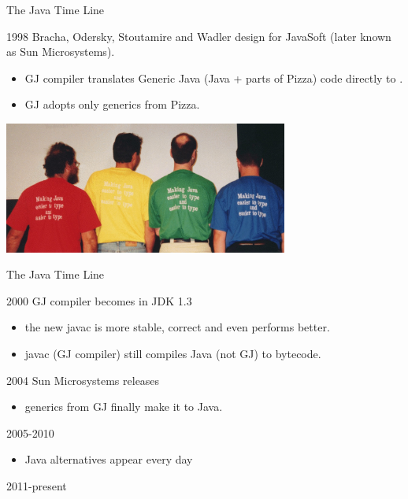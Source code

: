 \begin{frame}{The Java Time Line}
\begin{block}{1998}
Bracha, Odersky, Stoutamire and Wadler design  for
JavaSoft (later known as Sun Microsystems).
\begin{itemize}
\item GJ compiler translates Generic Java (Java + parts of Pizza)
 code directly to .
\item GJ adopts only generics from Pizza.
\end{itemize}
\end{block}
\begin{center}
\includegraphics[width=0.7\textwidth]{resources/GJBack.jpg}
\end{center}
\end{frame}

\begin{frame}{The Java Time Line}
\begin{block}{2000}
GJ compiler becomes  in JDK 1.3
\begin{itemize}
\item the new javac is more stable, correct and even performs better.
\item javac (GJ compiler) still compiles Java (\alert{not} GJ) to bytecode.
\end{itemize}
\end{block}
\pause
\begin{block}{2004}
Sun Microsystems releases 
\begin{itemize}
\item generics from GJ finally make it to Java.
\end{itemize}
\end{block}
\pause
\begin{block}{2005-2010}
\begin{itemize}
\item Java alternatives appear every day
\end{itemize}
\end{block}
\pause
\begin{block}{2011-present}
\end{block}
\end{frame}

